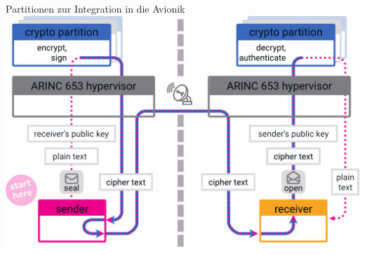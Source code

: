 \begin{frame}[c]{Partitionen zur Integration in die Avionik}
      \centering 
      \includegraphics[width=0.8\linewidth]{graphics/crypto partition}
\end{frame}







